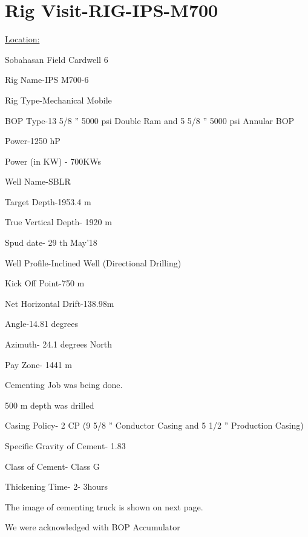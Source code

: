 \chapter{Rig Visit-RIG-IPS-M700}

\underline{Location:} 

Sobahasan Field Cardwell 6

Rig Name-IPS M700-6

Rig Type-Mechanical Mobile

BOP Type-13 5/8 ” 5000 psi Double Ram and 5 5/8 ” 5000 psi Annular BOP

\vspace{1em}


Power-1250 hP

Power (in KW) - 700KWs

\vspace{1em}


Well Name-SBLR

Target Depth-1953.4 m

True Vertical Depth- 1920 m

Spud date- 29 th May’18

Well Profile-Inclined Well (Directional Drilling)

Kick Off Point-750 m

Net Horizontal Drift-138.98m

Angle-14.81 degrees

Azimuth- 24.1 degrees North

Pay Zone- 1441 m


Cementing Job was being done.

500 m depth was drilled

Casing Policy- 2 CP (9 5/8 ” Conductor Casing and 5 1/2 ” Production Casing)

Specific Gravity of Cement- 1.83

Class of Cement- Class G

Thickening Time- 2- 3hours

The image of cementing truck is shown on next page.


We were acknowledged with BOP Accumulator



